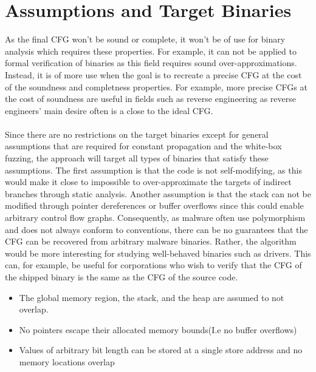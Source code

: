 \documentclass{kththesis}
\begin{document}
\section{Assumptions and Target Binaries}
%
%
%
%
As the final CFG won't be sound or complete, it won't be of use for binary analysis which requires these properties. For example, it can not be applied to formal verification of binaries as this field requires sound over-approximations. Instead, it is of more use when the goal is to recreate a precise CFG at the cost of the soundness and completness properties. For example, more precise CFGs at the cost of soundness are useful in fields such as reverse engineering as reverse engineers' main desire often is a close to the ideal CFG.
\\ \\
Since there are no restrictions on the target binaries except for general assumptions that are required for constant propagation and the white-box fuzzing, the approach will target all types of binaries that satisfy these assumptions. The first assumption is that the code is not self-modifying, as this would make it close to impossible to over-approximate the targets of indirect branches through static analysis. Another assumption is that the stack can not be modified through pointer dereferences or buffer overflows since this could enable arbitrary control flow graphs. Consequently, as malware often use polymorphism and does not always conform to conventions, there can be no guarantees that the CFG can be recovered from arbitrary malware binaries. Rather, the algorithm would be more interesting for studying well-behaved binaries such as drivers. This can, for example, be useful for corporations who wish to verify that the CFG of the shipped binary is the same as the CFG of the source code.

\begin{itemize}
    \item The global memory region, the stack, and the heap are assumed to not overlap.
    \item No pointers escape their allocated memory bounds(I.e no buffer overflows)
    \item Values of arbitrary bit length can be stored at a single store address and no memory locations overlap
\end{itemize}
\end{document}
